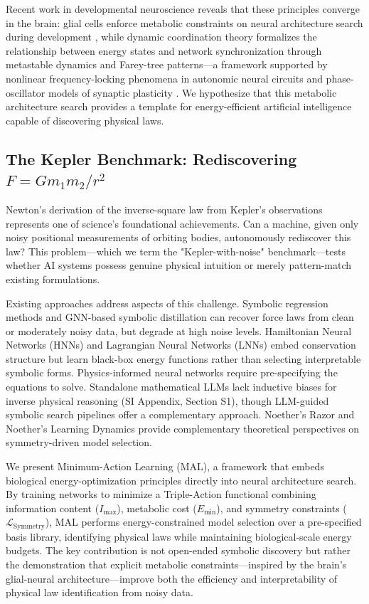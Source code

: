 \documentclass[9pt,twocolumn,twoside]{pnas-new}
\begin{document}
Recent work in developmental neuroscience reveals that these principles converge in the brain: glial cells enforce metabolic constraints on neural architecture search during development \cite{Herculano2014, vonBartheld2016}, while dynamic coordination theory \cite{Schoner1988, Kelso1995, Kelso2012, Kelso2021} formalizes the relationship between energy states and network synchronization through metastable dynamics \cite{Tognoli2014} and Farey-tree patterns---a framework supported by nonlinear frequency-locking phenomena in autonomic neural circuits \cite{Gebber1997} and phase-oscillator models of synaptic plasticity \cite{Chauhan2022}. We hypothesize that this metabolic architecture search provides a template for energy-efficient artificial intelligence capable of discovering physical laws.

\subsection*{The Kepler Benchmark: Rediscovering $F = Gm_1 m_2 / r^2$}
Newton's derivation of the inverse-square law from Kepler's observations represents one of science's foundational achievements. Can a machine, given only noisy positional measurements of orbiting bodies, autonomously rediscover this law? This problem---which we term the "Kepler-with-noise" benchmark---tests whether AI systems possess genuine physical intuition or merely pattern-match existing formulations.

Existing approaches address aspects of this challenge. Symbolic regression methods \cite{Udrescu2020, Cranmer2020} and GNN-based symbolic distillation \cite{Cranmer2020, Lemos2023} can recover force laws from clean or moderately noisy data, but degrade at high noise levels. Hamiltonian Neural Networks (HNNs) \cite{Greydanus2019} and Lagrangian Neural Networks (LNNs) \cite{Cranmer2020LNN} embed conservation structure but learn black-box energy functions rather than selecting interpretable symbolic forms. Physics-informed neural networks \cite{Raissi2019} require pre-specifying the equations to solve. Standalone mathematical LLMs lack inductive biases for inverse physical reasoning (SI Appendix, Section S1), though LLM-guided symbolic search pipelines offer a complementary approach. Noether's Razor \cite{vanderOuderaa2024} and Noether's Learning Dynamics \cite{Tanaka2021} provide complementary theoretical perspectives on symmetry-driven model selection.

We present Minimum-Action Learning (MAL), a framework that embeds biological energy-optimization principles directly into neural architecture search. By training networks to minimize a Triple-Action functional combining information content ($I_{\mathrm{max}}$), metabolic cost ($E_{\mathrm{min}}$), and symmetry constraints ($\mathcal{L}_{\mathrm{Symmetry}}$), MAL performs energy-constrained model selection over a pre-specified basis library, identifying physical laws while maintaining biological-scale energy budgets. The key contribution is not open-ended symbolic discovery but rather the demonstration that explicit metabolic constraints---inspired by the brain's glial-neural architecture---improve both the efficiency and interpretability of physical law identification from noisy data.
\end{document}
